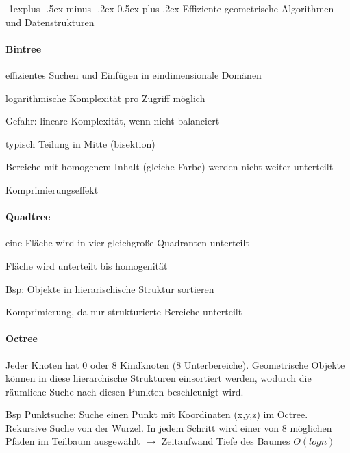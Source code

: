 \documentclass[landscape]{article}
\makeatletter
\renewcommand{\subsection}{\@startsection{subsection}{2}{0mm}%
                                {-1explus -.5ex minus -.2ex}%
                                {0.5ex plus .2ex}%
                                {\normalfont\normalsize\bfseries}}
\makeatother
\begin{document}
\begin{multicols}{3}
  \subsection{Effiziente geometrische Algorithmen und Datenstrukturen}
  \paragraph{Bintree}
  \begin{itemize*}
    \item effizientes Suchen und Einfügen in eindimensionale Domänen
    \item logarithmische Komplexität pro Zugriff möglich
    \item Gefahr: lineare Komplexität, wenn nicht balanciert
    \item typisch Teilung in Mitte (bisektion)
    \item Bereiche mit homogenem Inhalt (gleiche Farbe) werden nicht weiter unterteilt
    \item Komprimierungseffekt
  \end{itemize*}
  
  \paragraph{Quadtree}
  \begin{itemize*}
    \item eine Fläche wird in vier gleichgroße Quadranten unterteilt
    \item Fläche wird unterteilt bis homogenität
    \item Bsp: Objekte in hierarischische Struktur sortieren
    \item Komprimierung, da nur strukturierte Bereiche unterteilt
  \end{itemize*}
  
  \paragraph{Octree}
  Jeder Knoten hat 0 oder 8 Kindknoten (8 Unterbereiche). Geometrische Objekte können in diese hierarchische Strukturen einsortiert werden, wodurch die räumliche Suche nach diesen Punkten beschleunigt wird.
  
  Bsp Punktsuche: Suche einen Punkt mit Koordinaten (x,y,z) im Octree. Rekursive Suche von der Wurzel. In jedem Schritt wird einer von 8 möglichen Pfaden im Teilbaum ausgewählt $\rightarrow$ Zeitaufwand Tiefe des Baumes $O(log n)$
  

\end{multicols}
\end{document}
